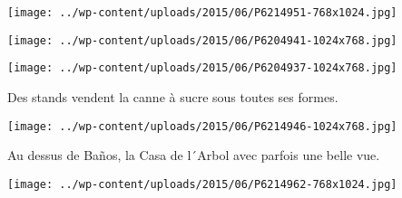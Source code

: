  \newline
 \newline
\centerline{\texttt{[image: ../wp-content/uploads/2015/06/P6214951-768x1024.jpg]} } 
 \newline
 \newline
\centerline{\texttt{[image: ../wp-content/uploads/2015/06/P6204941-1024x768.jpg]} } 
 \newline
 \newline
\centerline{\texttt{[image: ../wp-content/uploads/2015/06/P6204937-1024x768.jpg]} } 
 \newline
 Des stands vendent la canne à sucre sous toutes ses formes. \newline
 \newline
\centerline{\texttt{[image: ../wp-content/uploads/2015/06/P6214946-1024x768.jpg]} } 
 \newline
 Au dessus de Baños, la Casa de l´Arbol avec parfois une belle vue. \newline
 \newline
\centerline{\texttt{[image: ../wp-content/uploads/2015/06/P6214962-768x1024.jpg]} } 
 \newline

\newpage
 
